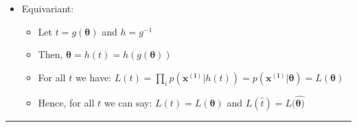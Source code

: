 \begin{itemize}
\begin{itemize}
\begin{itemize}
        \end{itemize}
        \item Equivariant: 
        \begin{itemize}
            \item Let $t = g(\boldsymbol{\theta})$ and $h = g^{-1}$ 
            \item Then, $\boldsymbol{\theta} = h(t) = h(g(\boldsymbol{\theta}))$
            \item For all $t$ we have: $L(t) = \prod_i p(\boldsymbol{x^({i})} | h(t)) = p(\boldsymbol{x^({i})} | \boldsymbol{\theta}) = L(\boldsymbol{\theta})$
            \item Hence, for all $t$ we can say: $L(t) = L(\boldsymbol{\theta})$ and $L(\hat{t}) = L(\hat{\boldsymbol{\theta})}$
        \end{itemize}
    \end{itemize}
\end{itemize}

{\color{lightgray}\hrule height 0.001mm}

